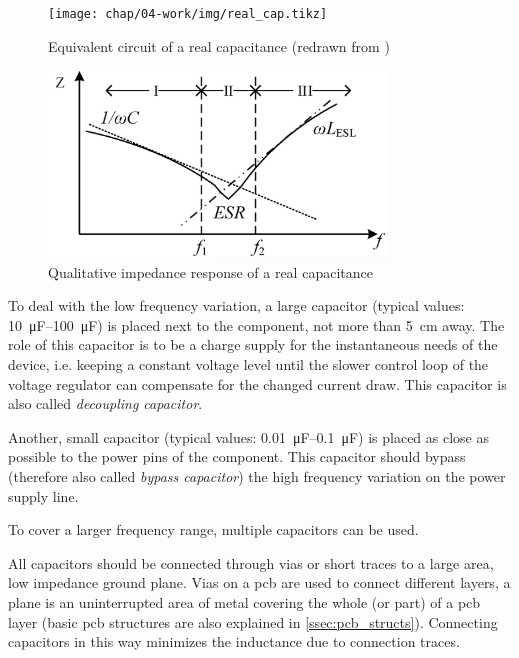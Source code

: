 \tikzexternaldisable
\begin{figure}[tbh]
	\centering
	\texttt{[image: chap/04-work/img/real\_cap.tikz]}
	\caption[Capacitor equivalent circuit]{Equivalent circuit of a real capacitance (redrawn from \cite{decouple})}
	\label{fig:real_cap}
\end{figure}
\tikzexternalenable
\begin{figure}[tbh]
	\centering
	\includegraphics[width = 0.8\textwidth]{chap/04-work/img/esl_esr}
	\caption[Impedance response of a real capacitor]{Qualitative impedance response of a real capacitance \cite{Dang2020}}
	\label{fig:esl_esr}
\end{figure}


To deal with the low frequency variation, a large capacitor (typical values: \SIrange{10}{100}{\micro\farad}) is placed next to the component, not more than \SI{5}{\centi \metre} away.
The role of this capacitor is to be a charge supply for the instantaneous needs of the device, i.e. keeping a constant voltage level until the slower control loop of the voltage regulator can compensate for the changed current draw. \cite{decouple}
This capacitor is also called \textit{decoupling capacitor}.

Another, small capacitor (typical values: \SIrange{0.01}{0.1}{\micro \farad}) is placed as close as possible to the power pins of the component.
This capacitor should bypass (therefore also called \textit{bypass capacitor}) the high frequency variation on the power supply line. \cite{decouple}

To cover a larger frequency range, multiple capacitors can be used.

All capacitors should be connected through vias or short traces to a large area, low impedance ground plane. Vias on a \gls{pcb} are used to connect different layers, a plane is an uninterrupted area of metal covering the whole (or part) of a \gls{pcb} layer (basic \gls{pcb} structures are also  explained in \autoref{ssec:pcb_structs}). 
Connecting capacitors in this way minimizes the inductance due to connection traces. \cite{decouple}

